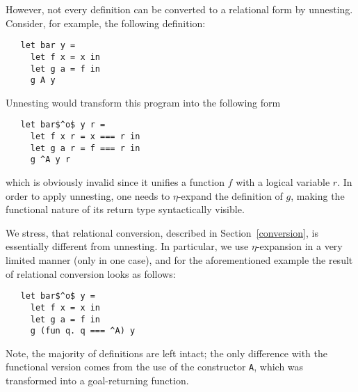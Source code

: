 However, not every definition can be converted to a relational form by unnesting. Consider, for example, the following definition:

\begin{lstlisting}
   let bar y =
     let f x = x in
     let g a = f in
     g A y
\end{lstlisting}

Unnesting would transform this program into the following form

\begin{lstlisting}
   let bar$^o$ y r =
     let f x r = x === r in
     let g a r = f === r in
     g ^A y r
\end{lstlisting}

\noindent which is obviously invalid since it unifies a function $f$ with a logical variable $r$. In order to apply unnesting, one
needs to $\eta$-expand the definition of $g$, making the functional nature of its return type syntactically visible.

We stress, that relational conversion, described in Section~\ref{conversion}, is essentially different from unnesting. In particular, 
we use $\eta$-expansion in a very limited manner (only in one case), and for the aforementioned example the result of relational
conversion looks as follows:

\begin{lstlisting}
   let bar$^o$ y =
     let f x = x in
     let g a = f in
     g (fun q. q === ^A) y
\end{lstlisting}

Note, the majority of definitions are left intact; the only difference with the functional version comes from the use of the constructor 
\lstinline|A|, which was transformed into a goal-returning function.



